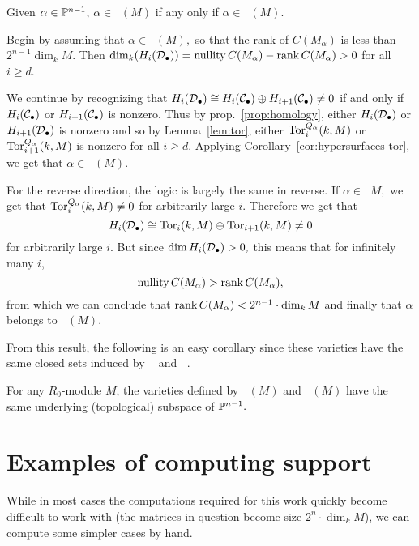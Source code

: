 \documentclass [11pt, proquest] {uwthesis}[2020/02/24]
\DeclareMathOperator{\supphRnaught}{supp^\mathit{hyp}_{R_0}}
\DeclareMathOperator{\supprRnaught}{supp^\mathit{rnk}_{R_0}}
\begin{document}
    \begin{thm}\label{thm:hyp-rank-equiv}
        Given $\alpha\in\mathbb{P}^{n-1}$, $\alpha\in\supprRnaught(M)$ if any only if $\alpha\in \supphRnaught(M).$
    \end{thm}
    \begin{prf}
        Begin by assuming that $\alpha\in\supprRnaught(M),$ so that the rank of $C(M_\alpha)$ is less than $2^{n-1}\dim_kM.$ Then $\dim_k(H_i(\mathcal{D}_\bullet))=\operatorname{nullity}C(M_\alpha)-\operatorname{rank} C(M_\alpha)>0$ for all $i\ge d$.
        
        We continue by recognizing that $H_i(\mathcal{D}_\bullet)\cong H_i(\mathcal{C}_\bullet)\oplus H_{i+1}(\mathcal{C}_\bullet)\ne0$ if and only if $H_i(\mathcal{C}_\bullet)$ or $H_{i+1}(\mathcal{C}_\bullet)$ is nonzero. Thus by prop.~\ref{prop:homology}, either $H_i(\mathcal{D}_\bullet)$ or $H_{i+1}(\mathcal{D}_\bullet)$ is nonzero and so by Lemma~\ref{lem:tor}, either $\operatorname{Tor}^{Q_\alpha}_i(k,M)$ or $\operatorname{Tor}^{Q_\alpha}_{i+1}(k,M)$ is nonzero for all $i\ge d$. Applying Corollary~\ref{cor:hypersurfaces-tor}, we get that $\alpha\in\supphRnaught(M).$
        
        For the reverse direction, the logic is largely the same in reverse. If $\alpha\in\supphRnaught M,$ we get that $\operatorname{Tor}_i^{Q_\alpha}(k,M)\ne0$ for arbitrarily large $i$. Therefore we get that 
        \[H_i(\mathcal{D}_\bullet)\cong \operatorname{Tor}_i(k,M)\oplus \operatorname{Tor}_{i+1}(k,M)\ne 0\]
        for arbitrarily large $i$. But since $\dim H_i(\mathcal{D}_\bullet)>0,$ this means that for infinitely many $i$,
        \[\operatorname{nullity} C(M_\alpha)>\operatorname{rank} C(M_\alpha),\]
        from which we can conclude that $\operatorname{rank} C(M_\alpha)<2^{n-1}\cdot\dim_k M$ and finally that $\alpha$ belongs to $\supprRnaught(M).$
    \end{prf}
    
    From this result, the following is an easy corollary since these varieties have the same closed sets induced by $\supphRnaught$ and $\supprRnaught$.
    \begin{cor}
        For any $R_0$-module $M$, the varieties defined by $\supphRnaught(M)$ and $\supprRnaught(M)$ have the same underlying (topological) subspace of $\mathbb{P}^{n-1}.$
    \end{cor}

\section{Examples of computing support}\label{sec:computing-support}
    While in most cases the computations required for this work quickly become difficult to work with (the matrices in question become size $2^n\cdot \dim_k M$), we can compute some simpler cases by hand. 
    
\end{document}
